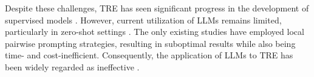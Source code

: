 

Despite these challenges, TRE has seen significant progress in the development of supervised models \cite{tan-etal-2023-event, niu-etal-2024-contempo}. However, current utilization of LLMs remains limited, particularly in zero-shot settings \cite{10.5555/3600270.3601883}.
The only existing studies \cite{yuan-etal-2023-zero, chan-etal-2024-exploring} have employed local pairwise prompting strategies, resulting in suboptimal results while also being time- and cost-inefficient. Consequently, the application of LLMs to TRE has been widely regarded as ineffective \cite{wei-etal-2024-llms, niu-etal-2024-contempo, chan-etal-2024-exploring}.




% 


